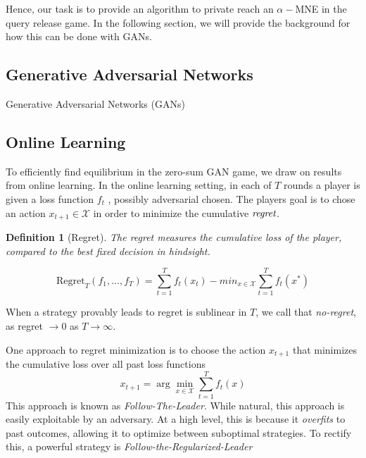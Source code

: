 \documentclass[]{article}
\newcommand{\X}{\mathcal{X}}
\newtheorem{definition}{Definition}
\begin{document}
Hence, our task is to provide an algorithm to private reach an $\alpha-$MNE in the query release game. In the following section, we will provide the background for how this can be done with GANs.



\subsection{Generative Adversarial Networks}

Generative Adversarial Networks (GANs) \todo{}


\subsection{Online Learning}

To efficiently find equilibrium in the zero-sum GAN game, we draw on results from online learning. In the online learning setting, in each of $T$ rounds a player is given a loss function $f_t$ , possibly adversarial chosen. The players goal is to chose an action $x_{t+1} \in \mathcal{X}$ in order to minimize the cumulative $\emph{regret}$. 

\begin{definition}[Regret]
    The regret measures the cumulative loss of the player, compared to the best fixed decision in hindsight. 

    \begin{equation}
        \text{Regret}_T(f_1,...,f_T) = \sum_{t=1}^T f_t(x_t) - min_{x \in \mathcal{X}} \sum_{t=1}^T f_t(x^*)
    \end{equation}
\end{definition}

When a strategy provably leads to regret is sublinear in $T$, we call that \emph{no-regret}, as regret $\to 0$ as $T \to \infty$.

One approach to regret minimization is to choose the action $x_{t+1}$ that minimizes the cumulative loss over all past loss functions
\begin{equation}
    x_{t+1} = \arg\min_{x \in \X} \sum_{t=1}^T f_t(x)
\end{equation}
This approach is known as \emph{Follow-The-Leader}. While natural, this approach is easily exploitable by an adversary. At a high level, this is because it \emph{overfits} to past outcomes, allowing it to optimize between suboptimal strategies. To rectify this, a powerful strategy is \emph{Follow-the-Regularized-Leader}
\end{document}
